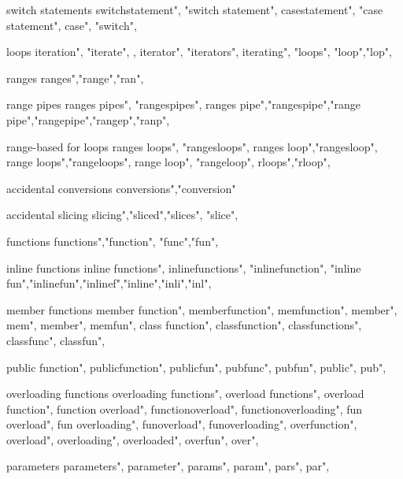          switch statements
        switchstatement", "switch statement", 
        casestatement", "case statement", 
        case", "switch", 

         loops
        iteration", "iterate", ,
        iterator", "iterators", 
        iterating", "loops", "loop","lop",

         ranges
        ranges","range","ran",

         range pipes
        ranges pipes", "rangespipes",
        ranges pipe","rangespipe","range pipe","rangepipe","rangep","ranp", 

         range-based for loops
        ranges loops", "rangesloops",  
        ranges loop","rangesloop",  
        range loops","rangeloops",  
        range loop", "rangeloop",  
        rloops","rloop",  

         accidental conversions
        conversions","conversion"
        
         accidental slicing 
        slicing","sliced","slices", "slice",
        
         functions
        functions","function", "func","fun",
        
         inline functions
        inline functions",  
        inlinefunctions", "inlinefunction", "inline fun","inlinefun","inlinef","inline","inli","inl", 
        
         member functions
        member function",  
        memberfunction",  
        memfunction",  
        member",  
        mem",  
        member",  
        memfun",  
        class function",  
        classfunction", 
        classfunctions", 
        classfunc",  
        classfun",  
        
        public function", 
        publicfunction", 
        publicfun", 
        pubfunc", 
        pubfun", 
        public",  
        pub",  
        
         overloading functions
        overloading functions", 
        overload functions", 
        overload function", 
        function overload", 
        functionoverload", 
        functionoverloading", 
        fun overload", 
        fun overloading", 
        funoverload", 
        funoverloading", 
        overfunction",  
        overload",  
        overloading", 
        overloaded",  
        overfun",  
        over",  
        
         parameters
        parameters",  
        parameter",  
        params",  
        param",  
        pars",  
        par",  
        
